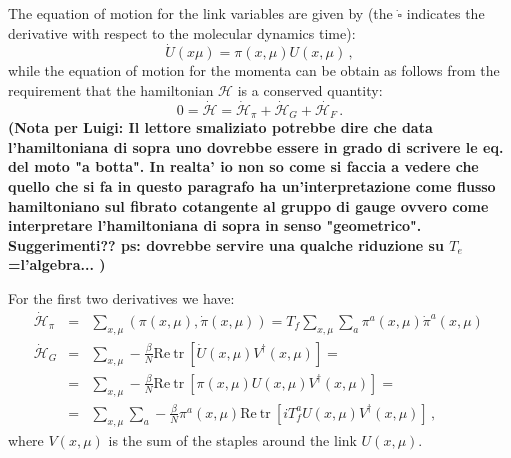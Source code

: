 \documentclass{article}[12pt]
\begin{document}
The equation of motion for the link variables are given by (the $\dot{\square}$ indicates the derivative with respect to the molecular dynamics time):
\begin{equation}
\dot U(x\mu) = \pi(x,\mu) U(x,\mu)\, ,
\end{equation}
while the equation of motion for the momenta can be obtain as follows from the requirement that the hamiltonian
$\mathcal{H}$ is a conserved quantity:
\begin{equation}
0 = \dot{\mathcal{H}} = \dot{\mathcal{H}}_\pi + \dot{\mathcal{H}}_G + \dot{\mathcal{H}_F} \, . \label{HCONS}
\end{equation}
\textbf{(Nota per Luigi: Il lettore smaliziato potrebbe dire che data l'hamil\-toniana di sopra uno dovrebbe essere in grado di scrivere le eq. del moto "a botta".
		In realta' io non so come si faccia a vedere che quello che si fa in questo paragrafo ha un'interpretazione come flusso hamil\-toniano sul fibrato cotangente al gruppo
		di gauge ovvero come interpretare l'hamiltoniana di sopra in senso "geometrico". Suggerimenti?? ps: dovrebbe servire una qualche riduzione su $T_e$=l'algebra... )}

For the first two derivatives we have:
\begin{eqnarray}
\dot{\mathcal{H}}_\pi &=& \sum_{x,\mu} ( \pi(x,\mu) , \dot\pi(x,\mu) ) = T_f \sum_{x,\mu} \sum_a \pi^a(x,\mu) \dot\pi^a(x,\mu) \, \label{HDOTPI}\\
		\dot{\mathcal{H}}_G &=& \sum_{x,\mu} -\frac{\beta}{N} \mathrm{Re\ tr\ } \left[ \dot U(x,\mu) V^\dagger(x,\mu) \right] = \nonumber \\
	&=& \sum_{x,\mu} -\frac{\beta}{N} \mathrm{Re\ tr\ } \left[ \pi(x,\mu) U(x,\mu) V^\dagger(x,\mu) \right] \nonumber = \\
	&=& \sum_{x,\mu} \sum_a -\frac{\beta}{N} \pi^a(x,\mu) \mathrm{Re\ tr\ } \left[ i T^a_f U(x,\mu) V^\dagger(x,\mu) \right] \, , \label{HDOTG}
\end{eqnarray}
where $V(x,\mu)$ is the sum of the staples around the link $U(x,\mu)$.
\end{document}
